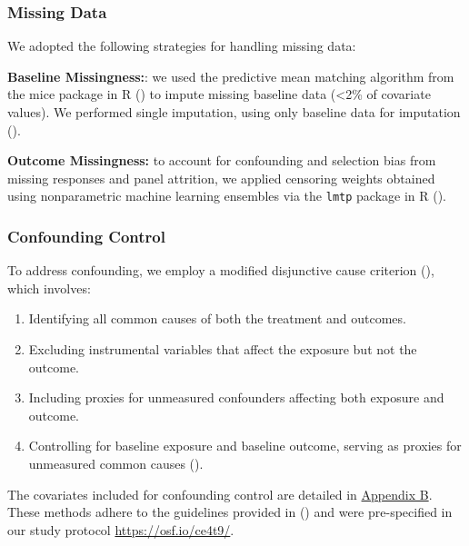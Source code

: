 \documentclass[
  single column]{article}
\providecommand{\tightlist}{%
  \setlength{\itemsep}{0pt}\setlength{\parskip}{0pt}}\usepackage{longtable,booktabs,array}
\begin{document}
\subsubsection{Missing Data}\label{missing-data}

We adopted the following strategies for handling missing data:

\textbf{Baseline Missingness:}: we used the predictive mean matching
algorithm from the mice package in R () to impute missing baseline data (\textless2\% of covariate
values). We performed single imputation, using only baseline data for
imputation ().

\textbf{Outcome Missingness:} to account for confounding and selection
bias from missing responses and panel attrition, we applied censoring
weights obtained using nonparametric machine learning ensembles via the
\texttt{lmtp} package in R ().

\subsubsection{Confounding Control}\label{confounding-control}

To address confounding, we employ a modified disjunctive cause criterion
(), which involves:

\begin{enumerate}
\def\labelenumi{\arabic{enumi}.}
\tightlist
\item
  Identifying all common causes of both the treatment and outcomes.
\item
  Excluding instrumental variables that affect the exposure but not the
  outcome.
\item
  Including proxies for unmeasured confounders affecting both exposure
  and outcome.
\item
  Controlling for baseline exposure and baseline outcome, serving as
  proxies for unmeasured common causes
  ().
\end{enumerate}

The covariates included for confounding control are detailed in
\hyperref[appendix-demographics]{Appendix B}. These methods adhere to
the guidelines provided in
() and were
pre-specified in our study protocol \url{https://osf.io/ce4t9/}.
\end{document}
